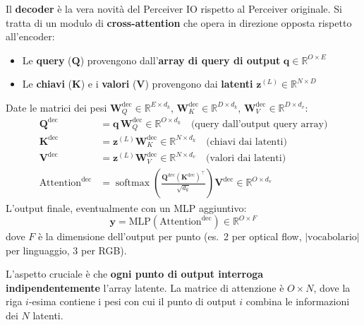 \documentclass[12pt,a4paper]{article}
\begin{document}
Il \textbf{decoder} \`e la vera novit\`a del Perceiver IO rispetto al Perceiver originale. Si tratta di un modulo di \textbf{cross-attention} che opera in direzione opposta rispetto all'encoder:

\begin{itemize}
    \item Le \textbf{query} ($\mathbf{Q}$) provengono dall'\textbf{array di query di output} $\mathbf{q} \in \mathbb{R}^{O \times E}$
    \item Le \textbf{chiavi} ($\mathbf{K}$) e i \textbf{valori} ($\mathbf{V}$) provengono dai \textbf{latenti} $\mathbf{z}^{(L)} \in \mathbb{R}^{N \times D}$
\end{itemize}

\begin{formulabox}
Date le matrici dei pesi $\mathbf{W}_Q^{\text{dec}} \in \mathbb{R}^{E \times d_k}$, $\mathbf{W}_K^{\text{dec}} \in \mathbb{R}^{D \times d_k}$, $\mathbf{W}_V^{\text{dec}} \in \mathbb{R}^{D \times d_v}$:
\begin{align}
    \mathbf{Q}^{\text{dec}} &= \mathbf{q} \, \mathbf{W}_Q^{\text{dec}} \in \mathbb{R}^{O \times d_k} \quad \text{(query dall'output query array)} \\
    \mathbf{K}^{\text{dec}} &= \mathbf{z}^{(L)} \mathbf{W}_K^{\text{dec}} \in \mathbb{R}^{N \times d_k} \quad \text{(chiavi dai latenti)} \\
    \mathbf{V}^{\text{dec}} &= \mathbf{z}^{(L)} \mathbf{W}_V^{\text{dec}} \in \mathbb{R}^{N \times d_v} \quad \text{(valori dai latenti)} \\[6pt]
    \text{Attention}^{\text{dec}} &= \operatorname{softmax}\!\left(\frac{\mathbf{Q}^{\text{dec}} (\mathbf{K}^{\text{dec}})^\top}{\sqrt{d_k}}\right) \mathbf{V}^{\text{dec}} \in \mathbb{R}^{O \times d_v}
\end{align}
L'output finale, eventualmente con un MLP aggiuntivo:
\[
\mathbf{y} = \text{MLP}\!\left(\text{Attention}^{\text{dec}}\right) \in \mathbb{R}^{O \times F}
\]
dove $F$ \`e la dimensione dell'output per punto (es.\ 2 per optical flow, $|\text{vocabolario}|$ per linguaggio, 3 per RGB).
\end{formulabox}

L'aspetto cruciale \`e che \textbf{ogni punto di output interroga indipendentemente} l'array latente. La matrice di attenzione \`e $O \times N$, dove la riga $i$-esima contiene i pesi con cui il punto di output $i$ combina le informazioni dei $N$ latenti.
\end{document}

